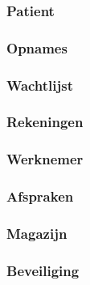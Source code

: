 \subsubsection{Patient}\label{cha:patient} %





\subsubsection{Opnames}\label{cha:opnames} %





\subsubsection{Wachtlijst}\label{cha:wachtlijst} %



\subsubsection{Rekeningen}\label{cha:rekeningen} %



\subsubsection{Werknemer}\label{cha:werknemer} %




\subsubsection{Afspraken}\label{cha:afspraken} %





\subsubsection{Magazijn}\label{cha:magazijn} %



\subsubsection{Beveiliging}

